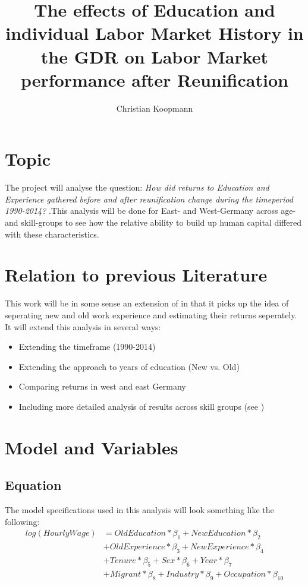 \documentclass{article}
\begin{document}
\title{The effects of Education and individual Labor Market History in the GDR on Labor Market
performance after Reunification}
\author{Christian Koopmann}
\maketitle


\section{Topic}
The project will analyse the question: \textit{How did returns to Education and Experience gathered before and after reunification change during the timeperiod 1990-2014? }.This analysis will be done for East- and West-Germany across age- and skill-groups to see how the relative ability to build up human capital differed with these characteristics.
\section{Relation to previous Literature}
This work will be in some sense an extension of \cite{gathmann_understanding_2004} in that it picks up the idea of seperating new and old work experience and estimating their returns seperately. It will extend this analysis in several ways:
\begin{itemize}
\item Extending the timeframe (1990-2014)
\item Extending the approach to years of education (New vs. Old)
\item Comparing returns in west and east Germany
\item Including more detailed analysis of results across skill groups (see \cite{orlowski_east_2009})
\end{itemize}
\section{Model and Variables}
\subsection{Equation}
The model specifications used in this analysis will look something like the following:
\begin{align*}
log(HourlyWage) &= OldEducation*\beta_{1} + NewEducation*\beta_{2}\\
& + OldExperience*\beta_{3} + NewExperience*\beta_{4}\\
&+ Tenure*\beta_{5} + Sex*\beta_{6} + Year*\beta_{7}\\
&+ Migrant*\beta_{8} + Industry*\beta_{9} + Occupation*\beta_{10}
\end{align*}
\end{document}
